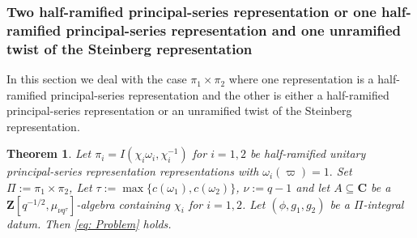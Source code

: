 \documentclass{amsart}
\theoremstyle{plain}
\newtheorem{thm}{Theorem}[subsection]
\theoremstyle{plain}
\theoremstyle{remark}
\begin{document}
\subsubsection{Two half-ramified principal-series representation or one half-ramified principal-series representation and one unramified twist of the Steinberg representation} In this section we deal with the case $\pi_1\times\pi_2$ where one representation is a half-ramified principal-series representation and the other is either a half-ramified principal-series representation or an unramified twist of the Steinberg representation. 
\begin{thm}\label{thm two half-ram p-s}
    Let $\pi_i=I(\chi_i\omega_i,\chi_i^{-1})$ for $i=1,2$ be half-ramified unitary principal-series representation representations with $\omega_i(\varpi)=1.$ Set $\Pi:=\pi_1\times\pi_2$, Let $\tau:=\max\{c(\omega_1),c(\omega_2)\}$, $\nu:=q-1$ and let $A\subseteq\mathbf{C}$ be a $\mathbf{Z}[q^{-1/2},\mu_{\nu q^\tau}]$-algebra containing $\chi_i$ for $i=1,2$. Let $(\phi,g_1,g_2)$ be a $\Pi$-integral datum. Then \eqref{eq: Problem} holds.
\end{thm}
\end{document}

